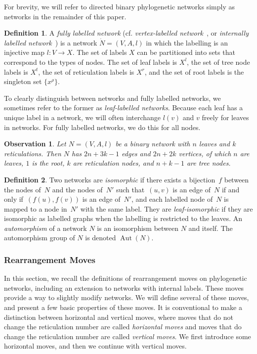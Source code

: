 \documentclass{article}
\newtheorem{observation}{Observation}
\theoremstyle{definition}
\newtheorem{definition}{Definition}
\DeclareMathOperator{\Aut}{Aut}
\begin{document}
For brevity, we will refer to directed binary phylogenetic networks simply as networks in the remainder of this paper.

\begin{definition}
A \emph{fully labelled network} (cf. \emph{vertex-labelled network}~\cite{fuchs2019counting}, or \textit{internally labelled network}~\cite{thesis_janssen}) is a network
$\dot{N}=(V,A,l)$ in which the labelling is an injective map $l:V\to X$. The set of labels $X$ can be partitioned into sets that correspond to the types of nodes. The set of leaf labels is $X^l$, the set of tree node labels is $X^t$, the set of reticulation labels is $X^r$, and the set of root labels is the singleton set $\{x^{\rho}\}$.
\end{definition}

To clearly distinguish between networks and fully labelled networks, we sometimes refer to the former as \textit{leaf-labelled networks}. Because each leaf has a unique label in a network, we will often interchange $l(v)$ and $v$ freely for leaves in networks. For fully labelled networks, we do this for all nodes. 

\begin{observation}\label{obs:numbers}
Let $N=(V,A,l)$ be a binary network with $n$ leaves and $k$ reticulations. Then $N$ has $2n+3k-1$ edges and $2n+2k$ vertices, of which $n$ are leaves, $1$ is the root, $k$ are reticulation nodes, and $n+k-1$ are tree nodes.
\end{observation}

\begin{definition}
Two networks are \emph{isomorphic} if there exists a bijection~$f$ between the nodes of~$N$ and the nodes of~$N'$ such that~$(u,v)$ is an edge of~$N$ if and only if~$(f(u),f(v))$ is an edge of~$N'$, and each labelled node of~$N$ is mapped to a node in~$N'$ with the same label. They are \emph{leaf-isomorphic} if they are isomorphic as labelled graphs when the labelling is restricted to the leaves. 
An \emph{automorphism} of a network $N$ is an isomorphism between $N$ and itself. The automorphism group of $N$ is denoted $\Aut(N)$.
\end{definition}

\subsubsection{Rearrangement Moves}\label{sec:rearr}
In this section, we recall the definitions of rearrangement moves on phylogenetic networks, including an extension to networks with internal labels. These moves provide a way to slightly modify networks. We will define several of these moves, and present a few basic properties of these moves. It is conventional \cite[e.g.][]{gambette2017rearrangement} to make a distinction between horizontal and vertical moves, where moves that do not change the reticulation number are called \emph{horizontal moves} and moves that do change the reticulation number are called \emph{vertical moves}. We first introduce some horizontal moves, and then we continue with vertical moves.
\end{document}

